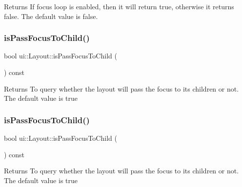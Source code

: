 \begin{DoxyReturn}{Returns}
If focus loop is enabled, then it will return true, otherwise it returns false. The default value is false. 
\end{DoxyReturn}
\mbox{\label{classui_1_1Layout_af9a1038bbc2d4429cd4d37d5b44b83ce}} 
\subsubsection{\texorpdfstring{is\+Pass\+Focus\+To\+Child()}{isPassFocusToChild()}\hspace{0.1cm}{\footnotesize\ttfamily [1/2]}}
{\footnotesize\ttfamily bool ui\+::\+Layout\+::is\+Pass\+Focus\+To\+Child (\begin{DoxyParamCaption}{ }\end{DoxyParamCaption}) const}

\begin{DoxyReturn}{Returns}
To query whether the layout will pass the focus to its children or not. The default value is true 
\end{DoxyReturn}
\mbox{\label{classui_1_1Layout_af9a1038bbc2d4429cd4d37d5b44b83ce}} 
\subsubsection{\texorpdfstring{is\+Pass\+Focus\+To\+Child()}{isPassFocusToChild()}\hspace{0.1cm}{\footnotesize\ttfamily [2/2]}}
{\footnotesize\ttfamily bool ui\+::\+Layout\+::is\+Pass\+Focus\+To\+Child (\begin{DoxyParamCaption}{ }\end{DoxyParamCaption}) const}

\begin{DoxyReturn}{Returns}
To query whether the layout will pass the focus to its children or not. The default value is true 
\end{DoxyReturn}
\mbox{\label{classui_1_1Layout_a3cfeefdfb70916a5673b337ea5b97666}} 

